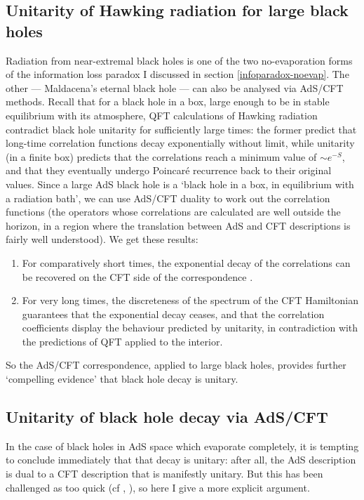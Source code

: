 \documentclass{article}
\begin{document}
\subsection{Unitarity of Hawking radiation for large black holes}\label{eternal-unitarity}

Radiation from near-extremal black holes is one of the two no-evaporation forms of the information loss paradox I discussed in section \ref{infoparadox-noevap}. The other --- Maldacena's eternal black hole --- can also be analysed via AdS/CFT methods. Recall that for a black hole in a box, large enough to be in stable equilibrium with its atmosphere, QFT calculations of Hawking radiation contradict black hole unitarity for sufficiently large times: the former predict that long-time correlation functions decay exponentially without limit, while unitarity (in a finite box) predicts that the correlations reach a minimum value of $\sim e^{-S}$, and that they eventually undergo Poincar\'{e} recurrence back to their original values. Since a large AdS black hole is a `black hole in a box, in equilibrium with a radiation bath', we can use AdS/CFT duality to work out the correlation functions (the operators whose correlations are calculated are well outside the horizon, in a region where the translation between AdS and CFT descriptions is fairly well understood). We get these results:
\begin{enumerate}
\item For comparatively short times, the exponential decay of the correlations can be recovered on the CFT side of the correspondence \cite{pr-infalling}.
\item For very long times, the discreteness of the spectrum of the CFT Hamiltonian guarantees that the exponential decay ceases, and that the correlation coefficients display the behaviour predicted by unitarity, in contradiction with the predictions of QFT applied to the interior. \cite{maldacena-eternal}
\end{enumerate}
So the AdS/CFT correspondence, applied to large black holes, provides further `compelling evidence' \cite[p.92]{harlowreview} that black hole decay is unitary.

\subsection{Unitarity of black hole decay via AdS/CFT}\label{unitarity-of-decay}

In the case of black holes in AdS space which evaporate completely, it is tempting to conclude immediately that that decay is unitary: after all, the AdS description is dual to a CFT description that is manifestly unitary. But this has been challenged as too quick (cf , ), so here I give a more explicit argument. 
\end{document}
